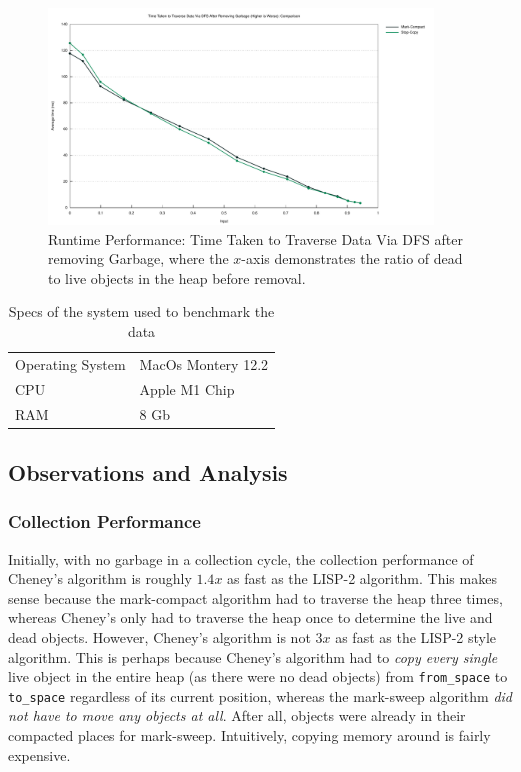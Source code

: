 \documentclass[index]{subfiles}
\begin{document}
\begin{figure}[H]
    \centering
    \includegraphics[width=0.91\textwidth]{pics/dfs.pdf}
    \caption{Runtime Performance: Time Taken to Traverse Data Via DFS after removing Garbage, where the \(x\)-axis demonstrates the ratio of dead to live objects in the heap before removal.}
\end{figure}

\begin{table}
    \centering
    \begin{tabular}{@{}ll@{}} \toprule
        Operating System & MacOs Montery 12.2 \\
        CPU               & Apple M1 Chip      \\
        RAM               & 8 Gb\\
        \bottomrule
    \end{tabular}
    \caption{Specs of the system used to benchmark the data}
\end{table}

\subsection{Observations and Analysis}

\subsubsection{Collection Performance}

Initially, with no garbage in a collection cycle, the collection performance of Cheney's algorithm is roughly \(1.4x\) as fast as the LISP-2 algorithm. This makes sense because the mark-compact algorithm had to traverse the heap three times, whereas Cheney's only had to traverse the heap once to determine the live and dead objects. However, Cheney's algorithm is not \(3x\) as fast as the LISP-2 style algorithm. This is perhaps because Cheney's algorithm had to \textit{copy every single} live object in the entire heap (as there were no dead objects) from \verb+from_space+ to \verb+to_space+ regardless of its current position, whereas the mark-sweep algorithm \textit{did not have to move any objects at all}. After all, objects were already in their compacted places for mark-sweep. Intuitively, copying memory around is fairly expensive.
\end{document}
